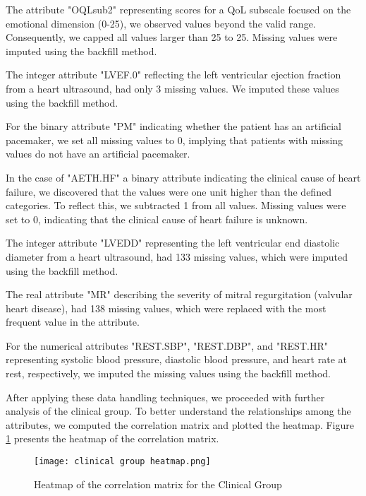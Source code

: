         The attribute "OQLsub2" representing scores for a QoL subscale focused on the emotional dimension (0-25), we observed values beyond the valid range. Consequently, we capped all values larger than 25 to 25. Missing values were imputed using the backfill method.
        
        The integer attribute "LVEF.0" reflecting the left ventricular ejection fraction from a heart ultrasound, had only 3 missing values. We imputed these values using the backfill method.
        
        For the binary attribute "PM" indicating whether the patient has an artificial pacemaker, we set all missing values to 0, implying that patients with missing values do not have an artificial pacemaker.
        
        In the case of "AETH.HF" a binary attribute indicating the clinical cause of heart failure, we discovered that the values were one unit higher than the defined categories. To reflect this, we subtracted 1 from all values. Missing values were set to 0, indicating that the clinical cause of heart failure is unknown.
        
        The integer attribute "LVEDD" representing the left ventricular end diastolic diameter from a heart ultrasound, had 133 missing values, which were imputed using the backfill method.
        
        The real attribute "MR" describing the severity of mitral regurgitation (valvular heart disease), had 138 missing values, which were replaced with the most frequent value in the attribute.
        
        For the numerical attributes "REST.SBP", "REST.DBP", and "REST.HR" representing systolic blood pressure, diastolic blood pressure, and heart rate at rest, respectively, we imputed the missing values using the backfill method.

        After applying these data handling techniques, we proceeded with further analysis of the clinical group. To better understand the relationships among the attributes, we computed the correlation matrix and plotted the heatmap. Figure \ref{fig:clinical group heatmap} presents the heatmap of the correlation matrix.
        
        \begin{figure}[H]
        \texttt{[image: clinical group heatmap.png]}
        \caption{Heatmap of the correlation matrix for the Clinical Group}
        \label{fig:clinical group heatmap}
        \end{figure}

